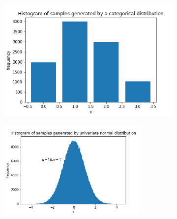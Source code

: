 \documentclass[english,11pt]{article}
\begin{document}
\begin{figure}[h]
\centering
\begin{subfigure}{.5\textwidth}
\centering
\includegraphics[width=.8\linewidth]{samplefigs/fig1.png}
\end{subfigure}%
\begin{subfigure}{.5\textwidth}
\centering
\includegraphics[width=0.8\textwidth]{samplefigs/fig2.png}
\end{subfigure}


\end{figure}
\end{document}
